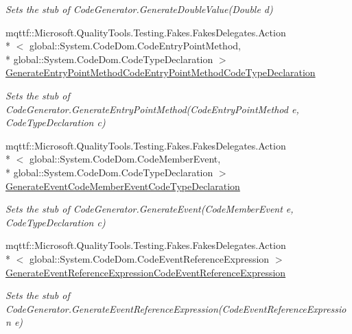 \begin{DoxyCompactItemize}
\begin{DoxyCompactList}\small\item\em Sets the stub of Code\-Generator.\-Generate\-Double\-Value(\-Double d)\end{DoxyCompactList}\item 
mqttf\-::\-Microsoft.\-Quality\-Tools.\-Testing.\-Fakes.\-Fakes\-Delegates.\-Action\\*
$<$ global\-::\-System.\-Code\-Dom.\-Code\-Entry\-Point\-Method, \\*
global\-::\-System.\-Code\-Dom.\-Code\-Type\-Declaration $>$ \hyperlink{class_system_1_1_code_dom_1_1_compiler_1_1_fakes_1_1_stub_code_compiler_abb80e565ce39c7e54d74dcc5a698c123}{Generate\-Entry\-Point\-Method\-Code\-Entry\-Point\-Method\-Code\-Type\-Declaration}
\begin{DoxyCompactList}\small\item\em Sets the stub of Code\-Generator.\-Generate\-Entry\-Point\-Method(\-Code\-Entry\-Point\-Method e, Code\-Type\-Declaration c)\end{DoxyCompactList}\item 
mqttf\-::\-Microsoft.\-Quality\-Tools.\-Testing.\-Fakes.\-Fakes\-Delegates.\-Action\\*
$<$ global\-::\-System.\-Code\-Dom.\-Code\-Member\-Event, \\*
global\-::\-System.\-Code\-Dom.\-Code\-Type\-Declaration $>$ \hyperlink{class_system_1_1_code_dom_1_1_compiler_1_1_fakes_1_1_stub_code_compiler_aaa5ab548f2d33ef1b8829eaf4a48cb77}{Generate\-Event\-Code\-Member\-Event\-Code\-Type\-Declaration}
\begin{DoxyCompactList}\small\item\em Sets the stub of Code\-Generator.\-Generate\-Event(\-Code\-Member\-Event e, Code\-Type\-Declaration c)\end{DoxyCompactList}\item 
mqttf\-::\-Microsoft.\-Quality\-Tools.\-Testing.\-Fakes.\-Fakes\-Delegates.\-Action\\*
$<$ global\-::\-System.\-Code\-Dom.\-Code\-Event\-Reference\-Expression $>$ \hyperlink{class_system_1_1_code_dom_1_1_compiler_1_1_fakes_1_1_stub_code_compiler_abd623fdeca351a366ee60c3f49c52a49}{Generate\-Event\-Reference\-Expression\-Code\-Event\-Reference\-Expression}
\begin{DoxyCompactList}\small\item\em Sets the stub of Code\-Generator.\-Generate\-Event\-Reference\-Expression(\-Code\-Event\-Reference\-Expression e)\end{DoxyCompactList}\item 

\end{DoxyCompactItemize}
